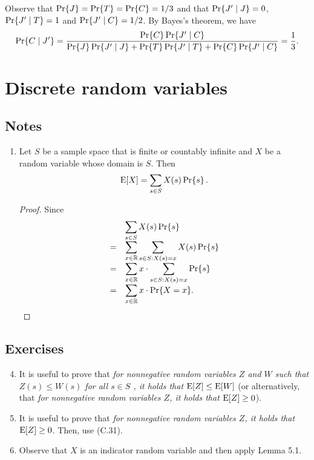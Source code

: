 \begin{enumerate}[\thesection-1]
Observe that $\Pr\!\left\{J\right\} = \Pr\!\left\{T\right\} = \Pr\!\left\{C\right\} = 1/3$ and that $\Pr\!\left\{J' \mid J\right\} = 0$, $\Pr\!\left\{J' \mid T\right\} = 1$ and $\Pr\!\left\{J' \mid C\right\} = 1/2$. By Bayes's theorem, we have
\[
\pr{C \given J'} = \frac{\pr{C} \pr{J' \given C}}{\pr{J} \pr{J' \given J} + \pr{T} \pr{J' \given T} + \pr{C} \pr{J' \given C}} = \frac{1}{3}.
\]
%
\end{enumerate}

\section{Discrete random variables}
\subsection*{Notes}
\begin{enumerate}
%
\item Let $S$ be a sample space that is finite or countably infinite and $X$ be a random variable whose domain is $S$. Then
\[
\mathrm{E}\!\left[X\right] = \sum_{s \in S} X(s) \Pr\!\left\{s\right\}.
\]
\begin{proof}
Since
\[
\begin{array}{ll}
  & {\displaystyle\sum_{s \in S} X(s) \Pr\!\left\{s\right\}} \cr
= & {\displaystyle\sum_{x \in \mathbb{R}} \sum_{s \in S : X(s) = x} X(s) \Pr\!\left\{s\right\}} \cr
= & {\displaystyle\sum_{x \in \mathbb{R}} x \cdot \sum_{s \in S : X(s) = x} \Pr\!\left\{s\right\}} \cr
= & {\displaystyle\sum_{x \in \mathbb{R}} x \cdot \Pr\!\left\{X = x\right\}}. \cr
\end{array}
\]
\end{proof}
%
\end{enumerate}
\subsection*{Exercises}
\begin{enumerate}[\thesection-1]
%
\setcounter{enumi}{3}
%
\item It is useful to prove that \emph{for nonnegative random variables $Z$ and $W$ such that $Z(s) \leq W(s)$ for all $s \in S$ , it holds that $\mathrm{E}\!\left[Z\right] \leq \mathrm{E}\!\left[W\right]$} (or alternatively, that \emph{for nonnegative random variables $Z$, it holds that $\mathrm{E}\!\left[Z\right] \geq 0$}).
%
\setcounter{enumi}{7}
%
\item It is useful to prove that \emph{for nonnegative random variables $Z$, it holds that $\mathrm{E}\!\left[Z\right] \geq 0$}. Then, use (C.31).
%
\item Observe that $X$ is an indicator random variable and then apply Lemma 5.1.
%
\end{enumerate}

